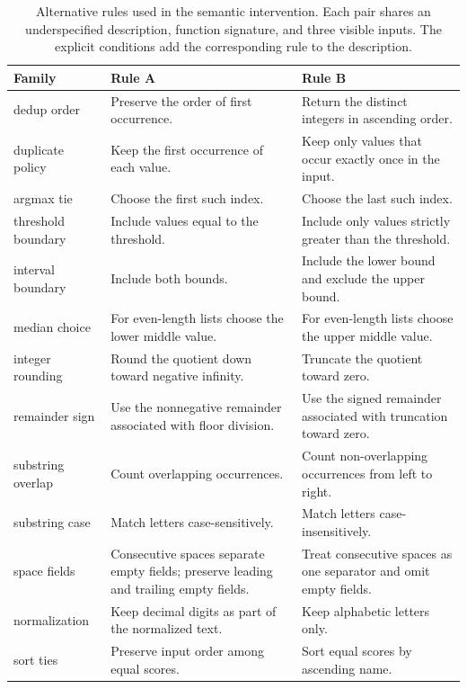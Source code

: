 \begin{table}[!htbp]
\centering
\caption{Alternative rules used in the semantic intervention. Each pair shares an underspecified description, function signature, and three visible inputs. The explicit conditions add the corresponding rule to the description.}
\label{tab:semantic-rules}
\small
\begin{tabularx}{\linewidth}{@{}>{\raggedright\arraybackslash}p{.18\linewidth}>{\raggedright\arraybackslash}X>{\raggedright\arraybackslash}X@{}}
\toprule
Family & Rule A & Rule B \\
\midrule
dedup order & Preserve the order of first occurrence. & Return the distinct integers in ascending order. \\
duplicate policy & Keep the first occurrence of each value. & Keep only values that occur exactly once in the input. \\
argmax tie & Choose the first such index. & Choose the last such index. \\
threshold boundary & Include values equal to the threshold. & Include only values strictly greater than the threshold. \\
interval boundary & Include both bounds. & Include the lower bound and exclude the upper bound. \\
median choice & For even-length lists choose the lower middle value. & For even-length lists choose the upper middle value. \\
integer rounding & Round the quotient down toward negative infinity. & Truncate the quotient toward zero. \\
remainder sign & Use the nonnegative remainder associated with floor division. & Use the signed remainder associated with truncation toward zero. \\
substring overlap & Count overlapping occurrences. & Count non-overlapping occurrences from left to right. \\
substring case & Match letters case-sensitively. & Match letters case-insensitively. \\
space fields & Consecutive spaces separate empty fields; preserve leading and trailing empty fields. & Treat consecutive spaces as one separator and omit empty fields. \\
normalization & Keep decimal digits as part of the normalized text. & Keep alphabetic letters only. \\
sort ties & Preserve input order among equal scores. & Sort equal scores by ascending name. \\

\end{tabularx}
\end{table}
